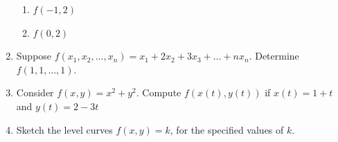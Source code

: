 \documentclass[12pt]{article}
\newif\ifans
\begin{document}
\begin{enumerate}
\begin{enumerate}
\item $f(-1,2)$

\ifans{\fbox{0}} \fi

\item $f(0,2)$

\ifans{\fbox{$\frac{2}{3}$}} \fi

\end{enumerate}

\item Suppose $f(x_1,x_2,\dots,x_n)=x_1+2x_2+3x_3+\dots+nx_n$.  Determine $f(1,1,\dots,1)$.

\ifans{\fbox{$\frac{n(n+1)}{2}$}} \fi

\item Consider $f(x,y)=x^2+y^2$.  Compute $f(x(t),y(t))$ if $x(t)=1+t$ and $y(t)=2-3t$

\ifans{\fbox{$10t^2-10t+5$}} \fi

\newpage

\item Sketch the level curves $f(x,y)=k$, for the specified values of $k$.


\end{enumerate}
\end{document}
